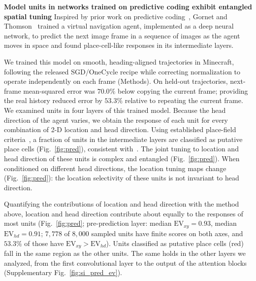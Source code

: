\documentclass[11pt]{article}
\begin{document}
{\bf Model units in networks trained on predictive coding exhibit entangled spatial tuning}
Inspired by prior work on predictive coding~\cite{Srinivasan1982predictive,Rao1999predictive}, Gornet and Thomson~\cite{Gornet2024automated} trained a virtual navigation agent, implemented as a deep neural network, to predict the next image frame in a sequence of images as the agent moves in space and found place-cell-like responses in its intermediate layers.

We trained this model on smooth, heading-aligned trajectories in Minecraft, following the released SGD/OneCycle recipe while correcting normalization to operate independently on each frame (Methods). On held-out trajectories, next-frame mean-squared error was $70.0\%$ below copying the current frame; providing the real history reduced error by $53.3\%$ relative to repeating the current frame. We examined units in four layers of this trained model. Because the head direction of the agent varies, we obtain the response of each unit for every combination of 2-D location and head direction.
Using established place-field criteria~\cite{Tanni2022}, a fraction of units in the intermediate layers are classified as putative place cells (Fig.~\ref{fig:pred}), consistent with~\cite{Gornet2024automated}. The joint tuning to location and head direction of these units is complex and entangled (Fig.~\ref{fig:pred}). When conditioned on different head directions, the location tuning maps change (Fig.~\ref{fig:pred}): the location selectivity of these units is not invariant to head direction.

Quantifying the contributions of location and head direction with the method above, location and head direction contribute about equally to the responses of most units (Fig.~\ref{fig:pred}; pre-prediction layer: median $\mathrm{EV}_{xy}=0.93$, median $\mathrm{EV}_{hd}=0.91$; $7{,}778$ of $8{,}000$ sampled units have finite scores on both axes, and $53.3\%$ of those have $\mathrm{EV}_{xy}>\mathrm{EV}_{hd}$). Units classified as putative place cells (red) fall in the same region as the other units.
The same holds in the other layers we analyzed, from the first convolutional layer to the output of the attention blocks (Supplementary Fig.~\ref{fig:si_pred_ev}).
\end{document}
